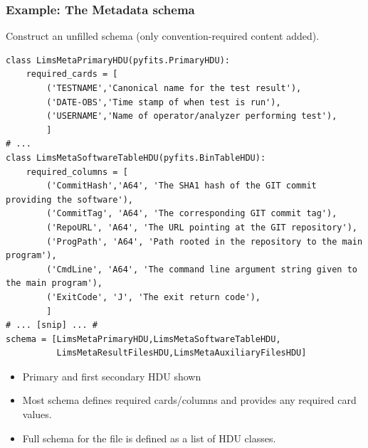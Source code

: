 \documentclass[xcolor=dvipsnames]{beamer}
\begin{document}
\begin{frame}[fragile]
  \frametitle{Example: The Metadata schema}

  Construct an unfilled schema (only convention-required content added).

  \begin{lstlisting}[emph={required_cards,required_columns,schema}]
class LimsMetaPrimaryHDU(pyfits.PrimaryHDU):
    required_cards = [
        ('TESTNAME','Canonical name for the test result'),
        ('DATE-OBS','Time stamp of when test is run'),
        ('USERNAME','Name of operator/analyzer performing test'),
        ]
# ...
class LimsMetaSoftwareTableHDU(pyfits.BinTableHDU):
    required_columns = [
        ('CommitHash','A64', 'The SHA1 hash of the GIT commit providing the software'), 
        ('CommitTag', 'A64', 'The corresponding GIT commit tag'),   
        ('RepoURL', 'A64', 'The URL pointing at the GIT repository'),  
        ('ProgPath', 'A64', 'Path rooted in the repository to the main program'),   
        ('CmdLine', 'A64', 'The command line argument string given to the main program'),    
        ('ExitCode', 'J', 'The exit return code'),
        ]
# ... [snip] ... #
schema = [LimsMetaPrimaryHDU,LimsMetaSoftwareTableHDU,
          LimsMetaResultFilesHDU,LimsMetaAuxiliaryFilesHDU]
  \end{lstlisting}
  \footnotesize
  \begin{itemize}
  \item Primary and first secondary HDU shown
  \item Most schema defines required cards/columns and provides any
    required card values.
  \item Full schema for the file is defined as a list of HDU classes.
  \end{itemize}
\end{frame}
\end{document}
